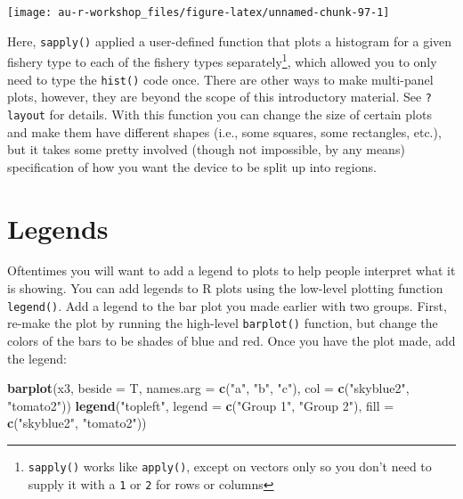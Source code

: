 \documentclass[]{book}
\newenvironment{Shaded}{\begin{snugshade}}{\end{snugshade}}
\newcommand{\KeywordTok}[1]{\textcolor[rgb]{0.13,0.29,0.53}{\textbf{#1}}}
\newcommand{\DataTypeTok}[1]{\textcolor[rgb]{0.13,0.29,0.53}{#1}}
\newcommand{\StringTok}[1]{\textcolor[rgb]{0.31,0.60,0.02}{#1}}
\newcommand{\NormalTok}[1]{#1}
\let\rmarkdownfootnote\footnote%
\def\footnote{\protect\rmarkdownfootnote}
\theoremstyle{definition}
\theoremstyle{definition}
\theoremstyle{definition}
\theoremstyle{remark}
\begin{document}
\begin{center}\texttt{[image: au-r-workshop\_files/figure-latex/unnamed-chunk-97-1]} \end{center}

Here, \texttt{sapply()} applied a user-defined function that plots a
histogram for a given fishery type to each of the fishery types
separately\footnote{\texttt{sapply()} works like \texttt{apply()},
  except on vectors only so you don't need to supply it with a
  \texttt{1} or \texttt{2} for rows or columns}, which allowed you to
only need to type the \texttt{hist()} code once. There are other ways to
make multi-panel plots, however, they are beyond the scope of this
introductory material. See \texttt{?layout} for details. With this
function you can change the size of certain plots and make them have
different shapes (i.e., some squares, some rectangles, etc.), but it
takes some pretty involved (though not impossible, by any means)
specification of how you want the device to be split up into regions.

\section{Legends}\label{legends}

Oftentimes you will want to add a legend to plots to help people
interpret what it is showing. You can add legends to R plots using the
low-level plotting function \texttt{legend()}. Add a legend to the bar
plot you made earlier with two groups. First, re-make the plot by
running the high-level \texttt{barplot()} function, but change the
colors of the bars to be shades of blue and red. Once you have the plot
made, add the legend:

\begin{Shaded}
\begin{Highlighting}[]
\KeywordTok{barplot}\NormalTok{(x3, }\DataTypeTok{beside =}\NormalTok{ T, }
        \DataTypeTok{names.arg =} \KeywordTok{c}\NormalTok{(}\StringTok{"a"}\NormalTok{, }\StringTok{"b"}\NormalTok{, }\StringTok{"c"}\NormalTok{),}
        \DataTypeTok{col =} \KeywordTok{c}\NormalTok{(}\StringTok{"skyblue2"}\NormalTok{, }\StringTok{"tomato2"}\NormalTok{))}
\KeywordTok{legend}\NormalTok{(}\StringTok{"topleft"}\NormalTok{, }\DataTypeTok{legend =} \KeywordTok{c}\NormalTok{(}\StringTok{"Group 1"}\NormalTok{, }\StringTok{"Group 2"}\NormalTok{),}
       \DataTypeTok{fill =} \KeywordTok{c}\NormalTok{(}\StringTok{"skyblue2"}\NormalTok{, }\StringTok{"tomato2"}\NormalTok{))}
\end{Highlighting}
\end{Shaded}
\end{document}
